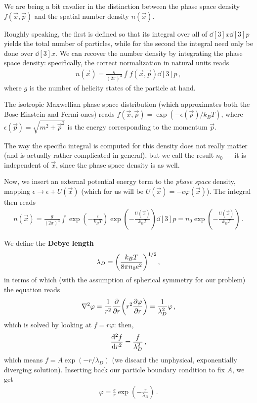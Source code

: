 \documentclass[main.tex]{subfiles}
\begin{document}
\begin{extracontent}
We are being a bit cavalier in the distinction between the phase space density \(f(\vec{x}, \vec{p})\) and the spatial number density \(n(\vec{x})\). 

Roughly speaking, the first is defined so that its integral over all of \(\dd[3]{x} \dd[3]{p}\) yields the total number of particles, while for the second the integral need only be done over \(\dd[3]{x}\). 
We can recover the number density by integrating the phase space density: specifically, the correct normalization in natural units reads 
%
\begin{align}
n(\vec{x}) = \frac{g}{(2 \pi )^3} \int f(\vec{x}, \vec{p}) \dd[3]{p}
\,,
\end{align}
%
where \(g\) is the number of helicity states of the particle at hand. 

The isotropic Maxwellian phase space distribution (which approximates both the Bose-Einstein and Fermi ones) reads \(f(\vec{x}, \vec{p}) = \exp(- \epsilon (\vec{p}) / k_B T)\), where \(\epsilon (\vec{p}) = \sqrt{m^2 + \vec{p}^2}\) is the energy corresponding to the momentum \(\vec{p}\). 

The way the specific integral is computed for this density does not really matter (and is actually rather complicated in general), but we call the result \(n_0 \) --- it is independent of \(\vec{x}\), since the phase space density is as well.

Now, we insert an external potential energy term to the \emph{phase space} density, mapping \(\epsilon \to \epsilon + U(\vec{x})\) (which for us will be \(U(\vec{x}) = - e \varphi (\vec{x})\)). The integral then reads 
%
\begin{align}
n(\vec{x}) = \frac{g}{(2 \pi )^3} \int \exp(- \frac{\epsilon }{k_B T}) \exp(- \frac{U(\vec{x})}{k_B T}) \dd[3]{p} = n_0 \exp(- \frac{U(\vec{x})}{k_B T})
\,.
\end{align}
\end{extracontent}


We define the \textbf{Debye length}
%
\begin{align}
\lambda _D = \qty(\frac{k_B T}{8 \pi n_0 e^2})^{1/2}
\,,
\end{align}
%
in terms of which (with the assumption of spherical symmetry for our problem) the equation reads 
%
\begin{align}
\nabla^2\varphi = \frac{1}{r^2} \pdv{r} \qty(r^2 \pdv{\varphi }{r}) 
= \frac{1}{\lambda _D^2} \varphi 
\,,
\end{align}
%
which is solved by looking at \(f = r \varphi \): then, 
%
\begin{align}
\dv[2]{f}{r} = \frac{f}{\lambda _D^2}
\,,
\end{align}
%
which means \(f = A \exp(- r / \lambda _D)\) (we discard the unphysical, exponentially diverging solution). 
Inserting back our particle boundary condition to fix \(A\), we get 
%
\begin{align}
\varphi = \frac{e}{r} \exp(- \frac{r}{\lambda _D})
\,.
\end{align}
\end{document}
